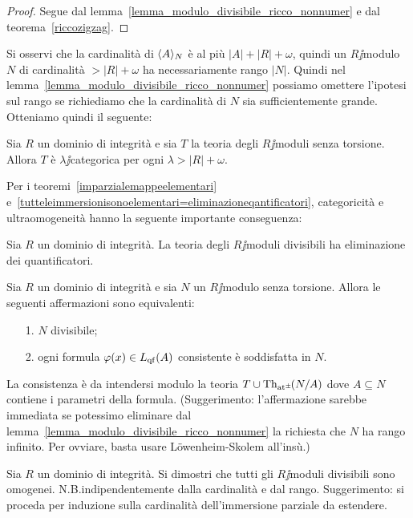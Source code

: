 \begin{proof}
Segue dal lemma~\ref{lemma_modulo_divisibile_ricco_nonnumer} e dal teorema~\ref{riccozigzag}.
\end{proof}

Si osservi che la cardinalit\`a di $\<A\>_N$ \`e al pi\`u $|A|+|R|+\omega$, quindi un $R\jj$modulo $N$ di cardinalit\`a $>|R|+\omega$ ha necessariamente rango $|N|$. Quindi nel lemma~\ref{lemma_modulo_divisibile_ricco_nonnumer} possiamo omettere l'ipotesi sul rango se richiediamo che la cardinalit\`a di $N$ sia sufficientemente grande. Otteniamo quindi il seguente:

\begin{corollary}\label{thm_ModDivUltraOmog}
Sia $R$ un dominio di integrit\`a e sia $T$ la teoria degli $R\jj$moduli senza torsione. Allora $T$ \`e $\lambda\jj$categorica per ogni $\lambda>|R|+\omega$.\QED
\end{corollary}



Per i teoremi~\ref{imparzialemappeelementari} e~\ref{tutteleimmersionisonoelementari=eliminazioneqantificatori}, categoricit\`a e ultraomogeneit\`a hanno la seguente importante conseguenza:

\begin{corollary}\label{corol_ModDivElQuan}
Sia $R$ un dominio di integrit\`a. La teoria degli $R\jj$moduli divisibili ha eliminazione dei quantificatori.\QED
\end{corollary}

\begin{exercise}\label{lkhfq}
Sia $R$ un dominio di integrit\`a e sia $N$ un $R\jj$modulo senza torsione. Allora le seguenti affermazioni sono equivalenti:
\begin{itemize}
\item[1.] $N$ divisibile;
\item[2.] ogni formula $\phi(x)\in L_{\rm qf}(A)$ consistente \`e soddisfatta in $N$.
\end{itemize} 
La consistenza \`e da intendersi modulo la teoria $T\cup\Diag(N/A)$ dove $A\subseteq N$ contiene i parametri della formula. (Suggerimento: l'affermazione sarebbe immediata se potessimo eliminare dal lemma~\ref{lemma_modulo_divisibile_ricco_nonnumer} la richiesta che $N$ ha rango infinito. Per ovviare, basta usare L\"owenheim-Skolem all'ins\`u.)
\end{exercise}

\begin{exercise}
Sia $R$ un dominio di integrit\`a. Si dimostri che tutti gli $R\jj$moduli divisibili sono omogenei. N.B.\@ indipendentemente dalla cardinalit\`a e dal rango. Suggerimento: si proceda per induzione sulla cardinalit\`a dell'immersione parziale da estendere.\QED
\end{exercise}

